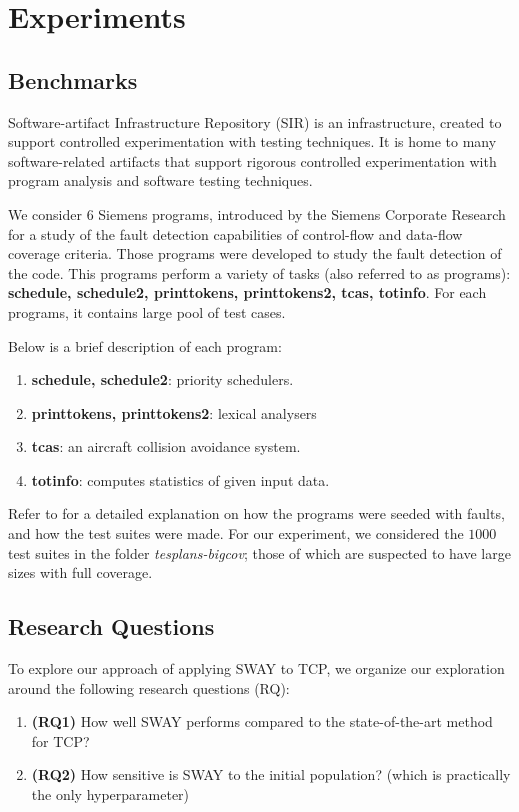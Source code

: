 \documentclass[10pt,journal,compsoc]{IEEEtran}
\begin{document}
	\section{Experiments}
	
	\subsection{Benchmarks}
	Software-artifact Infrastructure Repository (SIR)\cite{sir} is an infrastructure, created to support controlled experimentation with testing techniques. It is home to many software-related artifacts that support rigorous controlled experimentation with program analysis and software testing techniques. 
	
	We consider $6$ Siemens programs, introduced by the Siemens Corporate Research for a study of the fault detection capabilities of control-flow and data-flow coverage criteria\cite{siemens}.
	Those programs were developed to study the fault detection of the code. This programs perform a variety of tasks (also referred to as programs): {\bf schedule, schedule2, printtokens, printtokens2, tcas, totinfo}. For each programs, it contains large pool of test cases.
	
	Below is a brief description of each program:
	\begin{enumerate}
		\item {\bf schedule, schedule2}: priority schedulers.
		
		\item {\bf printtokens, printtokens2}: lexical analysers
		
		\item {\bf tcas}: an aircraft collision avoidance system.
		
		\item {\bf totinfo}: computes statistics of given input data.
	\end{enumerate}
	
	Refer to \cite{siemens} for a detailed explanation on how the programs were seeded with faults, and how the test suites were made.
	For our experiment, we considered the $1000$ test suites in the folder {\it tesplans-bigcov}; those of which are suspected to have large sizes with full coverage.
	
	
	\subsection{Research Questions}
	To explore our approach of applying SWAY to TCP, we organize our exploration around the following research questions (RQ):
	\begin{enumerate}
		\item {\bf (RQ1)} How well SWAY performs compared to the state-of-the-art method for TCP?
		\item {\bf (RQ2)} How sensitive is SWAY to the initial population? (which is practically the only hyperparameter)
	\end{enumerate}
	
\end{document}
